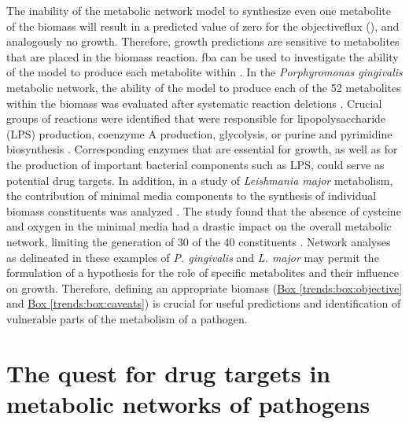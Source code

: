 The inability of the metabolic network model to synthesize even one 
metabolite of the \gls{biomass} will result in a predicted value 
of zero for the \gls{objectiveflux} (), and analogously no growth. 
Therefore, growth predictions are sensitive to metabolites that are 
placed in the \gls{biomass} reaction. \gls{fba} can be used to investigate the 
ability of the model to produce each metabolite within . In 
the \textit{Porphyromonas gingivalis} metabolic network, the ability of the 
model to produce each of the 52 metabolites within the \gls{biomass} 
was evaluated after systematic reaction deletions \cite{Mazumdar:2009gj}. 
Crucial groups of reactions were identified that were responsible for 
lipopolysaccharide (LPS) production, coenzyme A production, glycolysis, 
or purine and pyrimidine biosynthesis \cite{Mazumdar:2009gj}. Corresponding enzymes that 
are essential for growth, as well as for the production of important 
bacterial components such as LPS, could serve as potential drug 
targets. In addition, in a study of \textit{Leishmania major} metabolism, 
the contribution of minimal media components to the synthesis of 
individual \gls{biomass} constituents was analyzed \cite{Chavali:2008gh}. The study found 
that the absence of cysteine and oxygen in the minimal media had a 
drastic impact on the overall metabolic network, limiting the 
generation of 30 of the 40  constituents \cite{Chavali:2008gh}. Network analyses 
as delineated in these examples of \textit{P. gingivalis} and \textit{L. major} may 
permit the formulation of a hypothesis for the role of specific 
metabolites and their influence on growth. Therefore, defining an 
appropriate \gls{biomass} (\hyperref[trends:box:objective]{Box \ref{trends:box:objective}} and
\hyperref[trends:box:caveats]{Box \ref{trends:box:caveats}}) is crucial for useful 
predictions and identification of vulnerable parts of the metabolism 
of a pathogen.



\section[Drug targets in metabolic networks]{The quest for drug targets in metabolic networks of pathogens}

